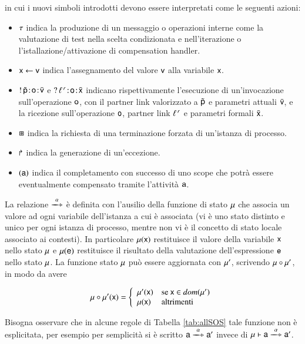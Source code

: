 in cui i nuovi simboli introdotti devono essere interpretati come le seguenti
azioni:

\begin{itemize}
  \item $\tau$ indica la produzione di un messaggio o operazioni interne come
  la valutazione di test nella scelta condizionata e nell'iterazione
  o l'istallazione/attivazione di compensation handler.
  \item ${\sf x} \leftarrow {\sf v}$ indica l'assegnamento del valore ${\sf v}$ alla
  variabile ${\sf x}$.
  \item $!\,\tilde{{\sf p}}\! : \! {\sf o}\! : \! \bar{{\sf v}}$ e
  $?\,\ell^{\,r}\! : \! {\sf o}\! : \! \bar{{\sf x}}$  indicano rispettivamente l'esecuzione di
  un'invocazione sull'operazione ${\sf o}$, con il partner link valorizzato a
  $\tilde{{\sf p}}$ e parametri attuali $\bar{{\sf v}}$, e la ricezione sull'operazione
  ${\sf o}$, partner link $\ell^{\,r}$ e parametri formali $\bar{{\sf x}}$.
  \item $\boxast$ indica la richiesta di una terminazione forzata di un'istanza 
  di processo.
  \item $\Rsh$ indica la generazione di un'eccezione.
  \item $({\sf a})$ indica il completamento con successo di uno scope
  che potrà essere eventualmente compensato tramite l'attività ${\sf a}$.
\end{itemize}

La relazione $\bpeltsarrow{\xalpha}$ è definita con l'ausilio della funzione di
stato ${\sf \mu}$ che associa un valore ad ogni variabile dell'istanza a cui è
associata (vi è uno stato distinto e unico per ogni istanza di processo, mentre
non vi è il concetto di stato locale associato ai contesti). In particolare
${\sf \mu}({\sf x})$ restituisce il valore della variabile ${\sf x}$ nello stato ${\sf \mu}$
e ${\sf \mu}({\sf e})$ restituisce il risultato della valutazione dell'espressione
${\sf e}$ nello stato ${\sf \mu}$. La funzione stato ${\sf \mu}$ può essere aggiornata
con ${\sf \mu}'$, scrivendo ${\sf \mu} \circ {\sf \mu}'$, in modo da avere 

$$
{\sf \mu} \circ {\sf \mu}'({\sf x}) = \left\{ 
\begin{array}{ll}
{\sf \mu}'({\sf x}) & \textrm{se ${\sf x} \in dom({\sf \mu}')$}\\
{\sf \mu}({\sf x}) & \textrm{altrimenti}\\
\end{array}
\right.
$$

Bisogna osservare che in alcune regole di Tabella \ref{tab:allSOS} tale
funzione non è esplicitata, per esempio per semplicità si è scritto
$\xinstnostate{\xsigma}{\xs}
\bpeltsarrow{\xalpha} \xinstnostate{\xsigma}{\xs'}$ invece di $\xinst{\xsigma}{\xs} \bpeltsarrow{\xalpha}
\xinstnostate{\xsigma}{\xs'}$.

